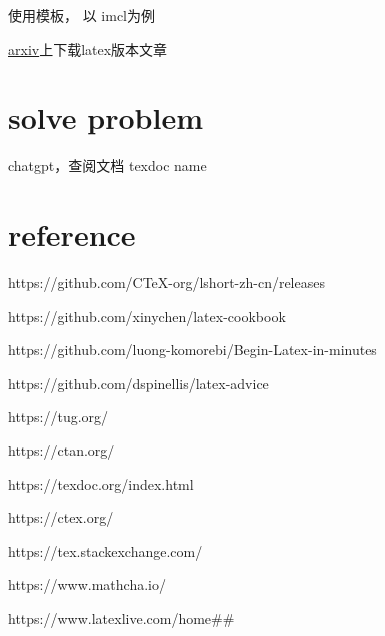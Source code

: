 \documentclass[11pt]{ctexart}
\begin{document}
使用模板， 以 imcl为例

\href{https://arxiv.org/}{arxiv}上下载latex版本文章
\section{solve problem}

 chatgpt，查阅文档  texdoc name





\section{reference}

https://github.com/CTeX-org/lshort-zh-cn/releases

https://github.com/xinychen/latex-cookbook

https://github.com/luong-komorebi/Begin-Latex-in-minutes

https://github.com/dspinellis/latex-advice

https://tug.org/

https://ctan.org/

https://texdoc.org/index.html

https://ctex.org/

https://tex.stackexchange.com/

https://www.mathcha.io/

https://www.latexlive.com/home\#\#



\end{document}
